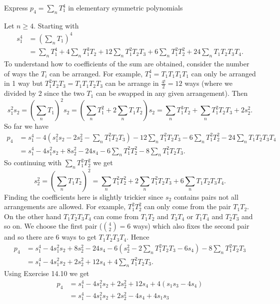     \begin{ex}{14.21}
        Express $p_4=\sum_nT_1^4$ in elementary symmetric polynomials
    \end{ex}
    \begin{sol}
        Let $n\geq 4$. Starting with
        \begin{align*}
            s_1^4 &= \left(\sum_nT_1\right)^4\\& = \sum_n T_1^4+4\sum_n T_1^3T_2+12\sum_n T_1^2T_2T_3+6\sum_nT_1^2T_2^2+24\sum_nT_1T_2T_3T_4.
        \end{align*}
        To understand how to coefficients of the sum are obtained, consider the number of ways the $T_i$ can be arranged. 
        For example, $T_1^4=T_1T_1T_1T_1$ can only be arranged in 1 way but $T_1^2T_2T_3=T_1T_1T_2T_3$ can be arrange in $\frac{4!}{2}=12$ ways (where we divided by 2 since the two $T_1$ can be swapped in any given arrangement).
        Then
        $$
            s_1^2s_2=\left(\sum_n T_1\right)^2s_2=\left(\sum_nT_1^2+2\sum_n T_1T_2\right)s_2 = \sum_n T_1^3T_2+\sum_nT_1^2T_2T_3+2s_2^2.
        $$
        So far we have
        \begin{align*}
            p_4 &= s_1^4-4\left(s_1^2s_2-2s_2^2-\sum_nT_1^2T_2T_3\right)-12\sum_n T_1^2T_2T_3-6\sum_nT_1^2T_2^2-24\sum_nT_1T_2T_3T_4\\
            &=s_1^4-4s_1^2s_2+8s_2^2-24s_4-6\sum_nT_1^2T_2^2-8\sum_n T_1^2T_2T_3.
        \end{align*}
        So continuing with $\sum_nT_1^2T_2^2$ we get
        $$
            s_2^2 = \left(\sum_n T_1T_2\right)^2=\sum_n T_1^2T_2^2+2\sum_n T_1^2 T_2T_3+6\sum_n T_1T_2T_3T_4.
        $$
        Finding the coefficients here is slightly trickier since $s_2$ contains pairs not all arrangements are allowed. 
        For example, $T_1^2T_2^2$ can only come from the pair $T_1T_2$. On the other hand $T_1T_2T_3T_4$ can come from $T_1T_2$ and $T_3T_4$ or $T_1T_4$ and $T_2T_3$ and so on.
        We choose the first pair (${4\choose 2}=6$ ways) which also fixes the second pair and so there are 6 ways to get $T_1T_2T_3T_4$.
        Hence
        \begin{align*}
            p_4 &= s_1^4-4s_1^2s_2+8s_2^2-24s_4-6\left(s_2^2-2\sum_nT_1^2T_2T_3-6s_4\right)-8\sum_n T_1^2T_2T_3\\
            &=s_1^4-4s_1^2s_2+2s_2^2+12s_4+4\sum_n T_1^2T_2T_3.
        \end{align*}
        Using Exercise 14.10 we get
        \begin{align*}
            p_4 &=s_1^4-4s_1^2s_2+2s_2^2+12s_4+4(s_1s_3-4s_4)\\
            &=s_1^4-4s_1^2s_2+2s_2^2-4s_4+4s_1s_3
        \end{align*}
    \end{sol}

